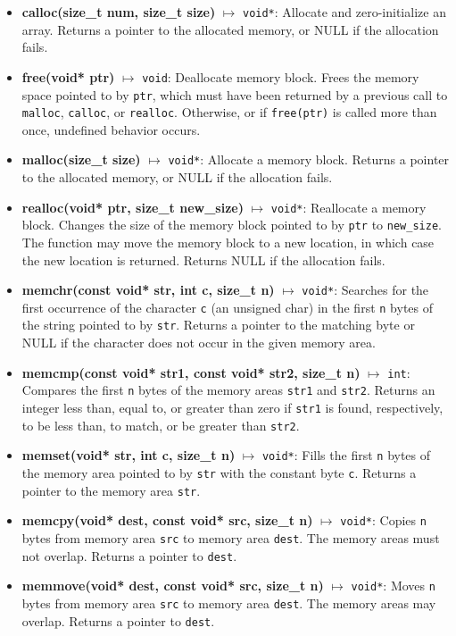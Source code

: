 \documentclass{report}
\begin{document}
    \pagebreak \bigbreak \noindent 
    \bigbreak \noindent 
    \begin{itemize}
        \item \textbf{calloc(size\_t num, size\_t size)} $\mapsto$ \texttt{void*}: Allocate and zero-initialize an array. Returns a pointer to the allocated memory, or NULL if the allocation fails.
        \item \textbf{free(void* ptr)} $\mapsto$ \texttt{void}: Deallocate memory block. Frees the memory space pointed to by \texttt{ptr}, which must have been returned by a previous call to \texttt{malloc}, \texttt{calloc}, or \texttt{realloc}. Otherwise, or if \texttt{free(ptr)} is called more than once, undefined behavior occurs.
        \item \textbf{malloc(size\_t size)} $\mapsto$ \texttt{void*}: Allocate a memory block. Returns a pointer to the allocated memory, or NULL if the allocation fails.
        \item \textbf{realloc(void* ptr, size\_t new\_size)} $\mapsto$ \texttt{void*}: Reallocate a memory block. Changes the size of the memory block pointed to by \texttt{ptr} to \texttt{new\_size}. The function may move the memory block to a new location, in which case the new location is returned. Returns NULL if the allocation fails.
         \item \textbf{memchr(const void* str, int c, size\_t n)} $\mapsto$ \texttt{void*}: Searches for the first occurrence of the character \texttt{c} (an unsigned char) in the first \texttt{n} bytes of the string pointed to by \texttt{str}. Returns a pointer to the matching byte or NULL if the character does not occur in the given memory area.
        \item \textbf{memcmp(const void* str1, const void* str2, size\_t n)} $\mapsto$ \texttt{int}: Compares the first \texttt{n} bytes of the memory areas \texttt{str1} and \texttt{str2}. Returns an integer less than, equal to, or greater than zero if \texttt{str1} is found, respectively, to be less than, to match, or be greater than \texttt{str2}.
        \item \textbf{memset(void* str, int c, size\_t n)} $\mapsto$ \texttt{void*}: Fills the first \texttt{n} bytes of the memory area pointed to by \texttt{str} with the constant byte \texttt{c}. Returns a pointer to the memory area \texttt{str}.
        \item \textbf{memcpy(void* dest, const void* src, size\_t n)} $\mapsto$ \texttt{void*}: Copies \texttt{n} bytes from memory area \texttt{src} to memory area \texttt{dest}. The memory areas must not overlap. Returns a pointer to \texttt{dest}.
        \item \textbf{memmove(void* dest, const void* src, size\_t n)} $\mapsto$ \texttt{void*}: Moves \texttt{n} bytes from memory area \texttt{src} to memory area \texttt{dest}. The memory areas may overlap. Returns a pointer to \texttt{dest}.
    \end{itemize}
\end{document}
